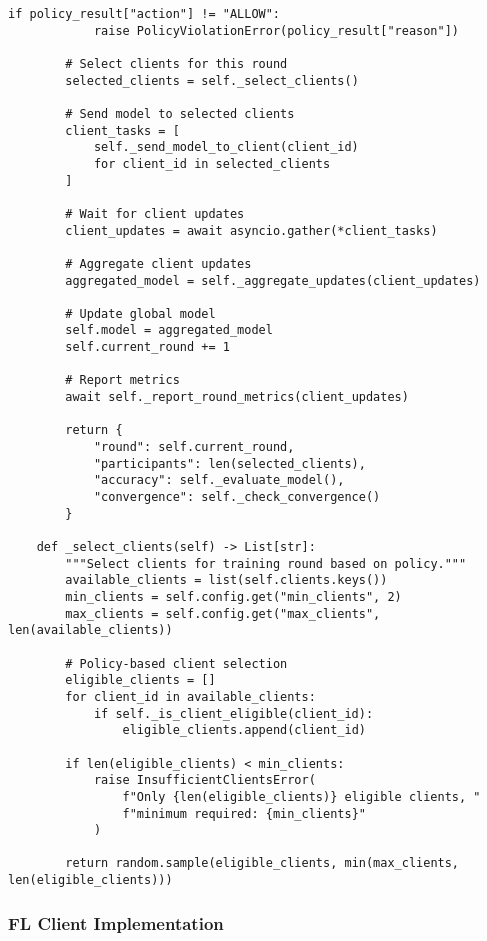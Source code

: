 \begin{lstlisting}[style=pythoncode, caption=FL Server Core Implementation]
        if policy_result["action"] != "ALLOW":
            raise PolicyViolationError(policy_result["reason"])
        
        # Select clients for this round
        selected_clients = self._select_clients()
        
        # Send model to selected clients
        client_tasks = [
            self._send_model_to_client(client_id)
            for client_id in selected_clients
        ]
        
        # Wait for client updates
        client_updates = await asyncio.gather(*client_tasks)
        
        # Aggregate client updates
        aggregated_model = self._aggregate_updates(client_updates)
        
        # Update global model
        self.model = aggregated_model
        self.current_round += 1
        
        # Report metrics
        await self._report_round_metrics(client_updates)
        
        return {
            "round": self.current_round,
            "participants": len(selected_clients),
            "accuracy": self._evaluate_model(),
            "convergence": self._check_convergence()
        }
    
    def _select_clients(self) -> List[str]:
        """Select clients for training round based on policy."""
        available_clients = list(self.clients.keys())
        min_clients = self.config.get("min_clients", 2)
        max_clients = self.config.get("max_clients", len(available_clients))
        
        # Policy-based client selection
        eligible_clients = []
        for client_id in available_clients:
            if self._is_client_eligible(client_id):
                eligible_clients.append(client_id)
        
        if len(eligible_clients) < min_clients:
            raise InsufficientClientsError(
                f"Only {len(eligible_clients)} eligible clients, "
                f"minimum required: {min_clients}"
            )
        
        return random.sample(eligible_clients, min(max_clients, len(eligible_clients)))
\end{lstlisting}

\subsubsection{FL Client Implementation}

